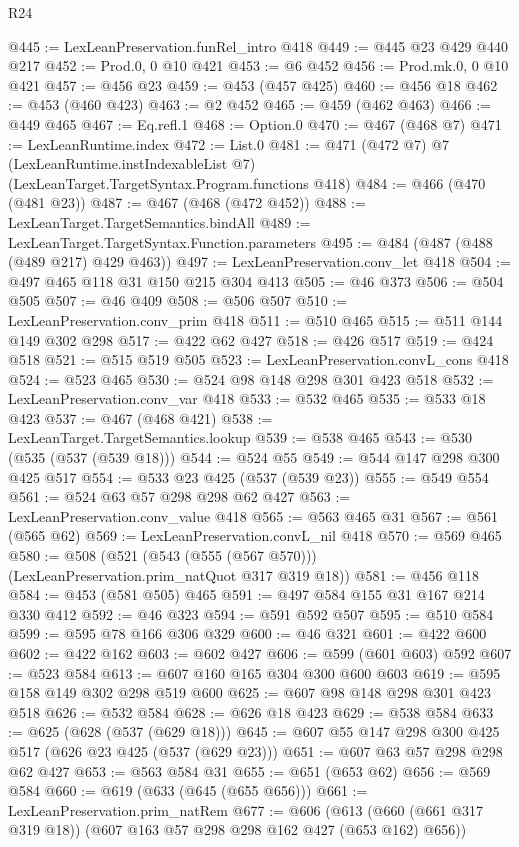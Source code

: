 \begin{lexlean}{R24}
\begin{coremodule}
@445 := LexLeanPreservation.funRel_intro @418
@449 := @445 @23 @429 @440 @217
@452 := Prod.{0, 0} @10 @421
@453 := @6 @452
@456 := Prod.mk.{0, 0} @10 @421
@457 := @456 @23
@459 := @453 (@457 @425)
@460 := @456 @18
@462 := @453 (@460 @423)
@463 := @2 @452
@465 := @459 (@462 @463)
@466 := @449 @465
@467 := Eq.refl.{1}
@468 := Option.{0}
@470 := @467 (@468 @7)
@471 := LexLeanRuntime.index
@472 := List.{0}
@481 := @471
    (@472 @7)
    @7
    (LexLeanRuntime.instIndexableList @7)
    (LexLeanTarget.TargetSyntax.Program.functions @418)
@484 := @466 (@470 (@481 @23))
@487 := @467 (@468 (@472 @452))
@488 := LexLeanTarget.TargetSemantics.bindAll
@489 := LexLeanTarget.TargetSyntax.Function.parameters
@495 := @484 (@487 (@488 (@489 @217) @429 @463))
@497 := LexLeanPreservation.conv_let @418
@504 := @497 @465 @118 @31 @150 @215 @304 @413
@505 := @46 @373
@506 := @504 @505
@507 := @46 @409
@508 := @506 @507
@510 := LexLeanPreservation.conv_prim @418
@511 := @510 @465
@515 := @511 @144 @149 @302 @298
@517 := @422 @62 @427
@518 := @426 @517
@519 := @424 @518
@521 := @515 @519 @505
@523 := LexLeanPreservation.convL_cons @418
@524 := @523 @465
@530 := @524 @98 @148 @298 @301 @423 @518
@532 := LexLeanPreservation.conv_var @418
@533 := @532 @465
@535 := @533 @18 @423
@537 := @467 (@468 @421)
@538 := LexLeanTarget.TargetSemantics.lookup
@539 := @538 @465
@543 := @530 (@535 (@537 (@539 @18)))
@544 := @524 @55
@549 := @544 @147 @298 @300 @425 @517
@554 := @533 @23 @425 (@537 (@539 @23))
@555 := @549 @554
@561 := @524 @63 @57 @298 @298 @62 @427
@563 := LexLeanPreservation.conv_value @418
@565 := @563 @465 @31
@567 := @561 (@565 @62)
@569 := LexLeanPreservation.convL_nil @418
@570 := @569 @465
@580 := @508 (@521 (@543 (@555 (@567 @570))) (LexLeanPreservation.prim_natQuot @317 @319 @18))
@581 := @456 @118
@584 := @453 (@581 @505) @465
@591 := @497 @584 @155 @31 @167 @214 @330 @412
@592 := @46 @323
@594 := @591 @592 @507
@595 := @510 @584
@599 := @595 @78 @166 @306 @329
@600 := @46 @321
@601 := @422 @600
@602 := @422 @162
@603 := @602 @427
@606 := @599 (@601 @603) @592
@607 := @523 @584
@613 := @607 @160 @165 @304 @300 @600 @603
@619 := @595 @158 @149 @302 @298 @519 @600
@625 := @607 @98 @148 @298 @301 @423 @518
@626 := @532 @584
@628 := @626 @18 @423
@629 := @538 @584
@633 := @625 (@628 (@537 (@629 @18)))
@645 := @607 @55 @147 @298 @300 @425 @517 (@626 @23 @425 (@537 (@629 @23)))
@651 := @607 @63 @57 @298 @298 @62 @427
@653 := @563 @584 @31
@655 := @651 (@653 @62)
@656 := @569 @584
@660 := @619 (@633 (@645 (@655 @656)))
@661 := LexLeanPreservation.prim_natRem
@677 := @606 (@613 (@660 (@661 @317 @319 @18)) (@607 @163 @57 @298 @298 @162 @427 (@653 @162) @656))

\end{coremodule}
\end{lexlean}
